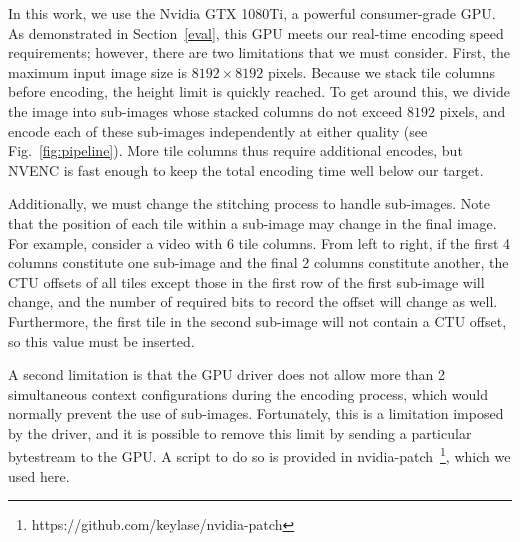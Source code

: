 In this work, we use the Nvidia GTX 1080Ti, a powerful consumer-grade GPU. As demonstrated in Section~\ref{eval}, this GPU meets our real-time encoding speed requirements; however, there are two limitations that we must consider.
%
First, the maximum input image size is $8192\times8192$ pixels. Because we stack tile columns before encoding, the height limit is quickly reached. To get around this, we divide the image into sub-images whose stacked columns do not exceed $8192$ pixels, and encode each of these sub-images independently at either quality (see Fig.~\ref{fig:pipeline}). More tile columns thus require additional encodes, but NVENC is fast enough to keep the total encoding time well below our target.

Additionally, we must change the stitching process to handle sub-images. Note that the position of each tile within a sub-image may change in the final image. For example, consider a video with 6 tile columns. From left to right, if the first 4 columns constitute one sub-image and the final 2 columns constitute another, the CTU offsets of all tiles except those in the first row of the first sub-image will change, and the number of required bits to record the offset will change as well. Furthermore, the first tile in the second sub-image will not contain a CTU offset, so this value must be inserted.

A second limitation is that the GPU driver does not allow more than 2 simultaneous context configurations during the encoding process, which would normally prevent the use of sub-images. Fortunately, this is a limitation imposed by the driver, and it is possible to remove this limit by sending a particular bytestream to the GPU. A script to do so is provided in nvidia-patch~\footnote{https://github.com/keylase/nvidia-patch}, which we used here.










